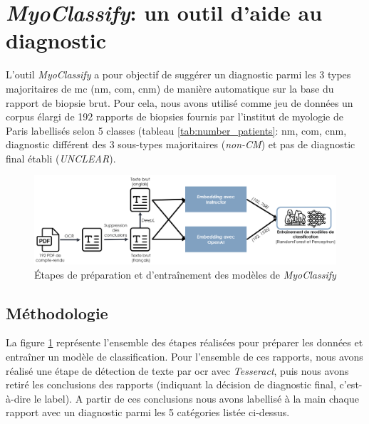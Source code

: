 \section{\textit{MyoClassify}: un outil d'aide au diagnostic}
L'outil \textit{MyoClassify} a pour objectif de suggérer un diagnostic parmi les 3 types majoritaires de \gls{mc} (\gls{nm}, \gls{com}, \gls{cnm}) de manière automatique sur la base du rapport de biopsie brut. Pour cela, nous avons utilisé comme jeu de données un corpus élargi de 192 rapports de biopsies fournis par l'institut de myologie de Paris labellisés selon 5 classes (tableau \ref{tab:number_patients}: \gls{nm}, \gls{com}, \gls{cnm}, diagnostic différent des 3 sous-types majoritaires (\textit{non-CM}) et pas de diagnostic final établi (\textit{UNCLEAR}).
\begin{figure}[!ht]
 \centering
 \includegraphics[width=1\textwidth]{figures/myoclassify_flow.png}
 \caption[Entraînement modèle \textit{MyoClassify}]{Étapes de préparation et d'entraînement des modèles de \textit{MyoClassify}}
 \label{fig:myoclassify_flow}
\end{figure}
\subsection{Méthodologie}
La figure \ref{fig:myoclassify_flow} représente l'ensemble des étapes réalisées pour préparer les données et entraîner un modèle de classification. Pour l'ensemble de ces rapports, nous avons réalisé une étape de détection de texte par \gls{ocr} avec \textit{Tesseract}, puis nous avons retiré les conclusions des rapports (indiquant la décision de diagnostic final, c'est-à-dire le label). A partir de ces conclusions nous avons labellisé à la main chaque rapport avec un diagnostic parmi les 5 catégories listée ci-dessus.

